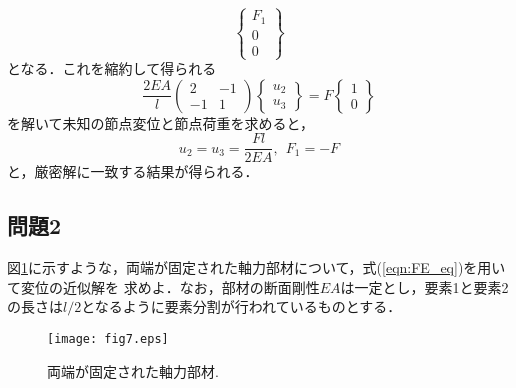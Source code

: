 \documentclass[10pt,a4j]{jarticle}
\begin{document}
\begin{enumerate}
\begin{equation}
	\left\{
	\begin{array}{c}
		F_1 \\
		0  \\
		0  
	\end{array}
	\right\}
	\label{eqn:FE_eq_ex2}
\end{equation}
となる．これを縮約して得られる
\begin{equation}
	\frac{2EA}{l}
	\left(
	\begin{array}{cc}
		2 & -1  \\
		-1 & 1 
	\end{array}
	\right)
	\left\{
	\begin{array}{c}
		u_2 \\
		u_3
	\end{array}
	\right\}
	=
	F
	\left\{
	\begin{array}{c}
		1 \\
		0 
	\end{array}
	\right\} 
	\label{eqn:}
\end{equation}
を解いて未知の節点変位と節点荷重を求めると，
\begin{equation}
	u_2=u_3=\frac{Fl}{2EA}, \ \ F_1=-F
	\label{eqn:sol_ex2}
\end{equation}
と，厳密解に一致する結果が得られる．
\end{enumerate}
\subsection{問題2}
図\ref{fig:fig7}に示すような，両端が固定された軸力部材について，式(\ref{eqn:FE_eq})を用いて変位の近似解を
求めよ．なお，部材の断面剛性$EA$は一定とし，要素1と要素2の長さは$l/2$となるように要素分割が行われているものとする．
\begin{figure}[h]
	\begin{center}
	\texttt{[image: fig7.eps]} 
	\end{center}
	\caption{両端が固定された軸力部材.} 
	\label{fig:fig7}
\end{figure}
\end{document}
